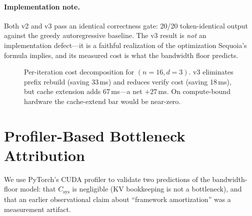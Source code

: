 \documentclass[letterpaper,twocolumn,10pt]{article}
\begin{document}
\paragraph{Implementation note.}
Both v2 and v3 pass an identical correctness gate: 20/20 token-identical output against the greedy autoregressive baseline.
The v3 result is \emph{not} an implementation defect---it is a faithful realization of the optimization Sequoia's formula implies, and its measured cost is what the bandwidth floor predicts.

\begin{figure}[t]
\centering
{}
\caption{Per-iteration cost decomposition for $(n{=}16, d{=}3)$. v3 eliminates prefix rebuild (saving 33\,ms) and reduces verify cost (saving 18\,ms), but cache extension adds 67\,ms---a net $+27\,$ms. On compute-bound hardware the cache-extend bar would be near-zero.}
\label{fig:v2v3}
\end{figure}


\section{Profiler-Based Bottleneck Attribution}
\label{sec:profiler}

We use PyTorch's CUDA profiler to validate two predictions of the bandwidth-floor model: that $C_{\text{sys}}$ is negligible (KV bookkeeping is not a bottleneck), and that an earlier observational claim about ``framework amortization'' was a measurement artifact.
\end{document}
